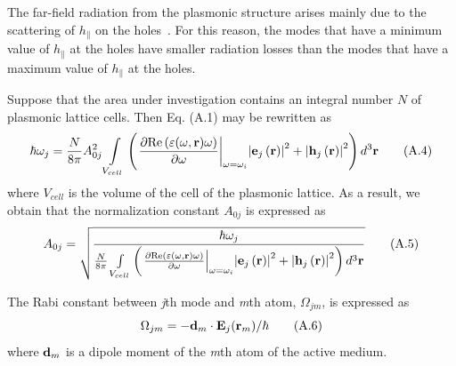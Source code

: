 \documentclass[aps,pra,amsmath,amssymb,onecolumn,superscriptaddress,showpacs,floatfix,]{revtex4-1}
\begin{document}
The far-field radiation from the plasmonic structure arises mainly due to the scattering of $h_{\parallel}$ on the holes~\cite{TennerJOpt}. 
For this reason, the modes that have a minimum value of $h_{\parallel}$ at the holes have smaller radiation losses than the modes that have a maximum value of $h_{\parallel}$ at the holes.

Suppose that the area under investigation contains an integral number $N$ of plasmonic lattice cells.
Then Eq. (A.1) may be rewritten as
\begin{equation}
\hbar {\omega _j} =\frac{N}{{8\pi }} A_{0j}^2 \int\limits_{{V_{cell}}} {\left( {{{\left. {\frac{{\partial {\mathop{\rm Re}\nolimits} \left( {\varepsilon(\omega, \textbf{r}) \omega } \right)}}{{\partial \omega }}} \right|}_{\omega  = {\omega _i}}}{{\left| {{{\bf{e}}_j}\left( {\bf{r}} \right)} \right|}^2} + {{\left| {{{\bf{h}}_j}\left( {\bf{r}} \right)} \right|}^2}} \right){d^3}{\bf{r}}} \tag{A.4}
\end{equation}
where ${V_{cell}}$  is the volume of the cell of the plasmonic lattice. As a result, we obtain that the normalization constant $A_{0j}$ is expressed as
\begin{equation}
A_{0j} =\sqrt{\frac{\hbar {\omega _j}}{\frac{N}{{8\pi }} \int\limits_{{V_{cell}}} {\left( {{{\left. {\frac{{\partial {\mathop{\rm Re}\nolimits} \left( {\varepsilon(\omega, \textbf{r}) \omega } \right)}}{{\partial \omega }}} \right|}_{\omega  = {\omega _i}}}{{\left| {{{\bf{e}}_j}\left( {\bf{r}} \right)} \right|}^2} + {{\left| {{{\bf{h}}_j}\left( {\bf{r}} \right)} \right|}^2}} \right){d^3}{\bf{r}}}}} \tag{A.5}
\end{equation}

The Rabi constant between \textit{j}th mode and \textit{m}th atom, ${\Omega _{jm}}$, is expressed as
\begin{equation}
{\Omega _{jm}} =  - {{{\bf{d}}_m} \cdot {{\bf{E}}_j}({{\bf{r}}_m})/ \hbar} \tag{A.6}
\end{equation}
where ${\bf{d}}_m$ is a dipole moment of the \textit{m}th atom of the active medium.
\end{document}

